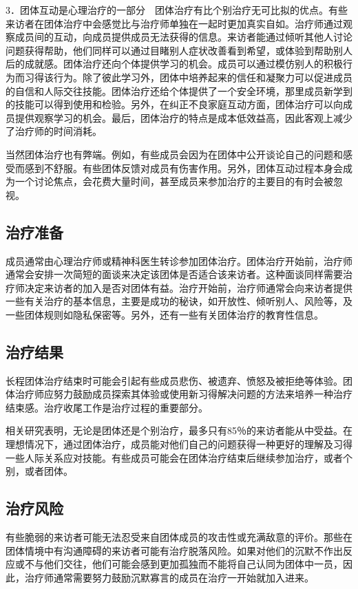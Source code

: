 3．团体互动是心理治疗的一部分　团体治疗有比个别治疗无可比拟的优点。有些来访者在团体治疗中会感觉比与治疗师单独在一起时更加真实自如。治疗师通过观察成员间的互动，向成员提供成员无法获得的信息。来访者能通过倾听其他人讨论问题获得帮助，他们同样可以通过目睹别人症状改善看到希望，或体验到帮助别人后的成就感。团体治疗还向个体提供学习的机会。成员可以通过模仿别人的积极行为而习得该行为。除了彼此学习外，团体中培养起来的信任和凝聚力可以促进成员的自信和人际交往技能。团体治疗还给个体提供了一个安全环境，那里成员新学到的技能可以得到使用和检验。另外，在纠正不良家庭互动方面，团体治疗可以向成员提供观察学习的机会。最后，团体治疗的特点是成本低效益高，因此客观上减少了治疗师的时间消耗。

当然团体治疗也有弊端。例如，有些成员会因为在团体中公开谈论自己的问题和感受而感到不舒服。有些团体反馈对成员有伤害作用。另外，团体互动过程本身会成为一个讨论焦点，会花费大量时间，甚至成员来参加治疗的主要目的有时会被忽视。

\subsection{治疗准备}

成员通常由心理治疗师或精神科医生转诊参加团体治疗。团体治疗开始前，治疗师通常会安排一次简短的面谈来决定该团体是否适合该来访者。这种面谈同样需要治疗师决定来访者的加入是否对团体有益。治疗开始前，治疗师通常会向来访者提供一些有关治疗的基本信息，主要是成功的秘诀，如开放性、倾听别人、风险等，及一些团体规则如隐私保密等。另外，还有一些有关团体治疗的教育性信息。

\subsection{治疗结果}

长程团体治疗结束时可能会引起有些成员悲伤、被遗弃、愤怒及被拒绝等体验。团体治疗师应努力鼓励成员探索其体验或使用新习得解决问题的方法来培养一种治疗结束感。治疗收尾工作是治疗过程的重要部分。

相关研究表明，无论是团体还是个别治疗，最多只有85％的来访者能从中受益。在理想情况下，通过团体治疗，成员能对他们自己的问题获得一种更好的理解及习得一些人际关系应对技能。有些成员可能会在团体治疗结束后继续参加治疗，或者个别，或者团体。

\subsection{治疗风险}

有些脆弱的来访者可能无法忍受来自团体成员的攻击性或充满敌意的评价。那些在团体情境中有沟通障碍的来访者可能有治疗脱落风险。如果对他们的沉默不作出反应或不与他们交往，他们可能会感到更加孤独而不能将自己认同为团体中一员，因此，治疗师通常需要努力鼓励沉默寡言的成员在治疗一开始就加入进来。

